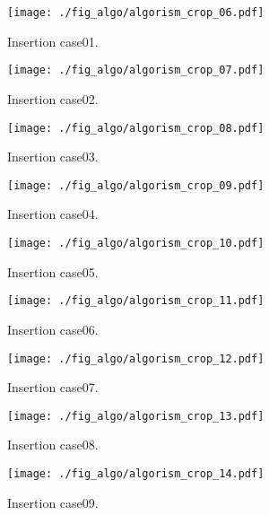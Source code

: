 \begin{figure}[h]
  \texttt{[image: ./fig\_algo/algorism\_crop\_06.pdf]}
  \caption{ Insertion case01. }
  \label{fig_IpCHashT_insert_hard_case01}
\end{figure}

\begin{figure}[h]
  \texttt{[image: ./fig\_algo/algorism\_crop\_07.pdf]}
  \caption{ Insertion case02. }
  \label{fig_IpCHashT_insert_hard_case02}
\end{figure}

\begin{figure}[h]
  \texttt{[image: ./fig\_algo/algorism\_crop\_08.pdf]}
  \caption{ Insertion case03. }
  \label{fig_IpCHashT_insert_hard_case03}
\end{figure}

\begin{figure}[h]
  \texttt{[image: ./fig\_algo/algorism\_crop\_09.pdf]}
  \caption{ Insertion case04. }
  \label{fig_IpCHashT_insert_hard_case04}
\end{figure}

\begin{figure}[h]
  \texttt{[image: ./fig\_algo/algorism\_crop\_10.pdf]}
  \caption{ Insertion case05. }
  \label{fig_IpCHashT_insert_hard_case05}
\end{figure}

\begin{figure}[h]
  \texttt{[image: ./fig\_algo/algorism\_crop\_11.pdf]}
  \caption{ Insertion case06. }
  \label{fig_IpCHashT_insert_hard_case06}
\end{figure}

\begin{figure}[h]
  \texttt{[image: ./fig\_algo/algorism\_crop\_12.pdf]}
  \caption{ Insertion case07. }
  \label{fig_IpCHashT_insert_hard_case07}
\end{figure}

\begin{figure}[h]
  \texttt{[image: ./fig\_algo/algorism\_crop\_13.pdf]}
  \caption{ Insertion case08. }
  \label{fig_IpCHashT_insert_hard_case08}
\end{figure}

\begin{figure}[h]
  \texttt{[image: ./fig\_algo/algorism\_crop\_14.pdf]}
  \caption{ Insertion case09. }
  \label{fig_IpCHashT_insert_hard_case09}
\end{figure}


